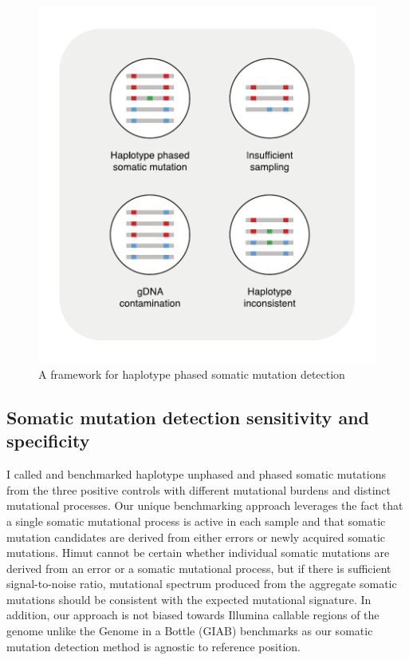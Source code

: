 \begin{figure}[htbp!]
\caption{A framework for haplotype phased somatic mutation detection}
\label{figure:haplotype-phased-somatic-mutation-detection}
\begin{centering}
\includegraphics[width=\textwidth]{Vector/haplotype_phased_somatic_mutation_detection.pdf}
\end{centering}
\end{figure}

\subsection{Somatic mutation detection sensitivity and specificity}

I called and benchmarked haplotype unphased and phased somatic mutations from the three positive controls with different mutational burdens and distinct mutational processes. Our unique benchmarking approach leverages the fact that a single somatic mutational process is active in each sample and that somatic mutation candidates are derived from either errors or newly acquired somatic mutations. Himut cannot be certain whether individual somatic mutations are derived from an error or a somatic mutational process, but if there is sufficient signal-to-noise ratio, mutational spectrum produced from the aggregate somatic mutations should be consistent with the expected mutational signature. In addition, our approach is not biased towards Illumina callable regions of the genome unlike the Genome in a Bottle (GIAB) benchmarks \cite{Zook2014-et} as our somatic mutation detection method is agnostic to reference position. 

